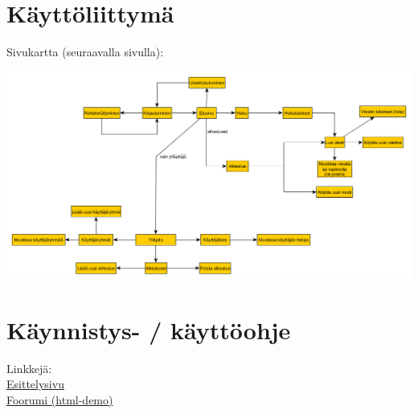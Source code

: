 \documentclass[12pt,a4paper,leqno]{report}
\begin{document}
\chapter{Käyttöliittymä}

Sivukartta (seuraavalla sivulla):

\begin{sideways}
\includegraphics[scale=.6]{sivukartta}
\end{sideways}

\chapter{Käynnistys- / käyttöohje}

Linkkejä:\\
\href{http://wlehtoma.users.cs.helsinki.fi/Keskustelufoorumi/esittelysivu.html}{Esittelysivu}\\
\href{http://wlehtoma.users.cs.helsinki.fi/Keskustelufoorumi/html-demo/}{Foorumi (html-demo)}
\end{document}
